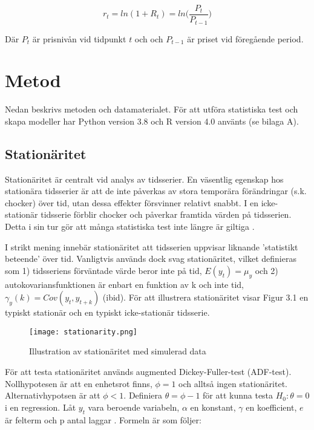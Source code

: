 \documentclass[11pt]{article}
\numberwithin{equation}{section}
\numberwithin{table}{section}
\numberwithin{figure}{section}
\begin{document}
\begin{equation}
    r_{t} = ln(1+R_{t}) = ln \Big( \frac{P_{t}}{P_{t-1}} \Big)
\end{equation}

Där $P_{t}$ är prisnivån vid tidpunkt $t$ och och $P_{t-1}$ är priset vid föregående period. 









\newpage
\section{Metod}
Nedan beskrivs metoden och datamaterialet. För att utföra statistiska test och skapa modeller har Python version 3.8 och R version 4.0 använts (se bilaga A). 

\subsection{Stationäritet}
Stationäritet är centralt vid analys av tidsserier. En väsentlig egenskap hos stationära tidsserier är att de inte påverkas av stora temporära förändringar (s.k. chocker) över tid, utan dessa effekter försvinner relativt snabbt. I en icke-stationär tidsserie förblir chocker och påverkar framtida värden på tidsserien. Detta i sin tur gör att många statistiska test inte längre är giltiga \parencite[][,s.329 f.]{montgomery2015forecasting}. \par

I strikt mening innebär stationäritet att tidsserien uppvisar liknande 'statistikt beteende' över tid. Vanligtvis används dock svag stationäritet, vilket definieras som 1) tidsseriens förväntade värde beror inte på tid, \(E(y_t)=\mu_y\) och 2) autokovariansfunktionen är enbart en funktion av k och inte tid, \(\gamma_y(k) = Cov(y_t, y_{t+k})\) (ibid). För att illustrera stationäritet visar Figur 3.1 en typiskt stationär och en typiskt icke-stationär tidsserie.

\begin{figure}[H]
\caption{Illustration av stationäritet med simulerad data}
\texttt{[image: stationarity.png]}
\centering
\end{figure}

För att testa stationäritet används augmented Dickey-Fuller-test (ADF-test). Nollhypotesen är att en enhetsrot finns, \(\phi=1\) och alltså ingen stationäritet. Alternativhypotsen är att \(\phi<1\). Definiera \(\theta = \phi -1 \) för att kunna testa \(H_0:\theta=0\) i en regression. Låt \(y_t\) vara beroende variabeln, \( \alpha \) en konstant, \( \gamma \) en koefficient, \(e\) är felterm och p antal laggar \parencite[][,s.610 ff.]{wooldridge2018introductory}. Formeln är som följer:
\end{document}
